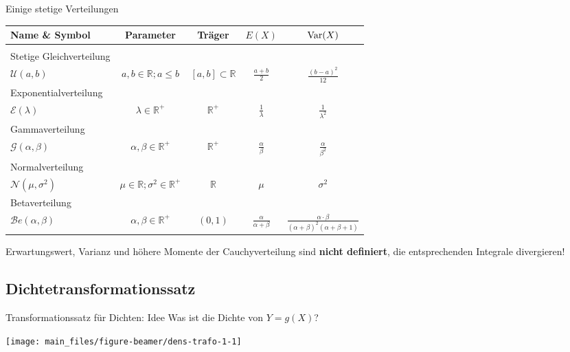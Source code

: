 \documentclass[
  10pt,
  ignorenonframetext,
]{beamer}
\begin{document}
\begin{frame}{Einige stetige Verteilungen}
\label{einige-stetige-verteilungen}
\begin{center}
\begin{tabular}{l|c c c c}
Name \& Symbol 
& Parameter
& Träger
& $E(X)$
& $\operatorname{Var}(X)$ \\
\hline
\\
Stetige Gleichverteilung\\
$ \mathcal{U}(a, b)$
& $a, b  \in \mathbb R; a \leq b$
& $[a, b] \subset \mathbb R$
& $\frac{a + b}{2}$
& $\frac{(b - a)^2}{12}$\\[1.5em]

Exponentialverteilung\\
$ \mathcal{E}(\lambda) $
& $\lambda \in \mathbb R^+$
& $\mathbb R^+$
& $\frac{1}{\lambda}$
& $\frac{1}{\lambda^2}$\\[1.5em]

Gammaverteilung\\
$\mathcal{G}(\alpha, \beta)$
& $\alpha, \beta \in \mathbb R^+$
& $\mathbb R^+$
& $\frac{\alpha}{\beta}$
& $\frac{\alpha}{\beta^2}$\\[1.5em]

Normalverteilung\\
$ \mathcal{N}(\mu, \sigma^2)$
& $\mu \in \mathbb R; \sigma^2 \in \mathbb R^+$
& $\mathbb R $
& $\mu$
& $\sigma^2$\\[1.5em]

Betaverteilung\\
$ {\mathcal Be}(\alpha, \beta)$
& $\alpha, \beta \in \mathbb R^+$
& $(0, 1)$
& $\frac{\alpha}{\alpha + \beta}$
& $\frac{\alpha \cdot \beta}
{(\alpha+\beta)^2 (\alpha+\beta+1)}$
\end{tabular}
\end{center}

Erwartungswert, Varianz und höhere Momente der Cauchyverteilung sind
\textbf{nicht definiert}, die entsprechenden Integrale divergieren!
\end{frame}

\subsection{Dichtetransformationssatz}\label{dichtetransformationssatz}

\begin{frame}{Transformationssatz für Dichten: Idee}
\label{transformationssatz-fuxfcr-dichten-idee}
Was ist die Dichte von \(Y = g(X)\)?

\scriptsize

\begin{center}\texttt{[image: main\_files/figure-beamer/dens-trafo-1-1]} \end{center}

\normalsize
\end{frame}
\end{document}
